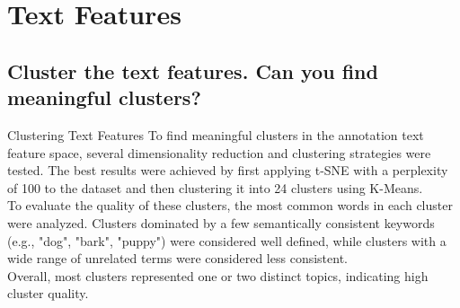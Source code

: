 
\section{Text Features}
\label{sec:Text Features}
\subsection{Cluster the text features. Can you find meaningful clusters?}
\label{sec:Text Features:a}
 Clustering Text Features
To find meaningful clusters in the annotation text feature space, several dimensionality reduction and clustering strategies were tested. The best results were achieved by first applying t-SNE with a perplexity of 100 to the dataset and then clustering it into 24 clusters using K-Means. \\
To evaluate the quality of these clusters, the most common words in each cluster were analyzed. Clusters dominated by a few semantically consistent keywords (e.g., "dog", "bark", "puppy") were considered well defined, while clusters with a wide range of unrelated terms were considered less consistent.\\
Overall, most clusters represented one or two distinct topics, indicating high cluster quality.


